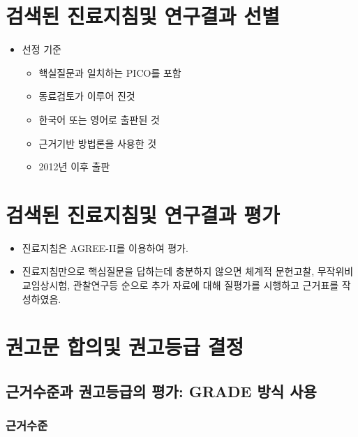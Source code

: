 \documentclass[]{book}
\providecommand{\tightlist}{%
  \setlength{\itemsep}{0pt}\setlength{\parskip}{0pt}}
\begin{document}
\hypertarget{section-56}{%
\section{검색된 진료지침및 연구결과 선별}\label{section-56}}

\begin{itemize}
\tightlist
\item
  선정 기준

  \begin{itemize}
  \tightlist
  \item
    핵실질문과 일치하는 PICO를 포함
  \item
    동료검토가 이루어 진것
  \item
    한국어 또는 영어로 출판된 것
  \item
    근거기반 방법론을 사용한 것
  \item
    2012년 이후 출판
  \end{itemize}
\end{itemize}

\hypertarget{section-57}{%
\section{검색된 진료지침및 연구결과 평가}\label{section-57}}

\begin{itemize}
\tightlist
\item
  진료지침은 AGREE-II를 이용하여 평가.
\item
  진료지침만으로 핵심질문을 답하는데 충분하지 않으면 체계적 문헌고찰, 무작위비교임상시험, 관찰연구등 순으로 추가 자료에 대해 질평가를 시행하고 근거표를 작성하였음.
\end{itemize}

\hypertarget{section-58}{%
\section{권고문 합의및 권고등급 결정}\label{section-58}}

\hypertarget{grade--}{%
\subsection*{근거수준과 권고등급의 평가: GRADE 방식 사용}\label{grade--}}

\hypertarget{section-59}{%
\subsubsection*{근거수준}\label{section-59}}
\end{document}
